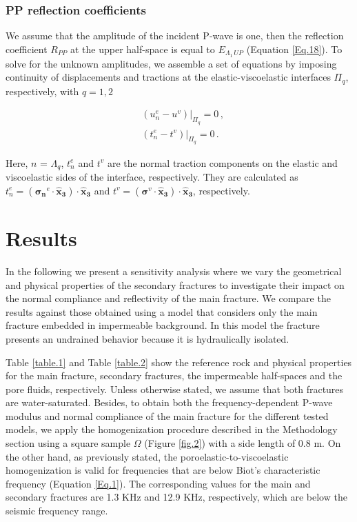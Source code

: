 \documentclass[draft]{agujournal2019}
\begin{document}
\subsubsection{PP reflection coefficients}
We assume that the amplitude of the incident P-wave is one, then the reflection coefficient $R_{PP}$ at the upper half-space is equal to $E_{\Lambda_1\, UP}$ (Equation \eqref{Eq.18}). To solve for the unknown amplitudes,  we assemble a set of equations by imposing continuity of displacements and tractions at the elastic-viscoelastic interfaces $\Pi_q$, respectively, with $q=1,2$
\begin{linenomath*}
\begin{equation}\label{Eq.22}
\begin{split}
&  \left. \left(  u_n^e -  u^v \right) \right \rvert_{\Pi_q} = 0 \,, \\
&  \left. \left( t_n^e  - t^v  \right) \right \rvert_{\Pi_q} = 0 \,.
\end{split}
\end{equation}
\end{linenomath*}
Here, $n$ = $\Lambda_q$, $t_n^e$ and $t^v$ are the normal traction components on the elastic and viscoelastic sides of the interface, respectively. They are calculated as $t_n^e =( \bm{\sigma_n}^e \cdot \bm{\hat {x}_3})\cdot \bm{\hat {x}_3} $ and  
$t^v =( \bm{\sigma}^v \cdot \bm{\hat {x}_3})\cdot \bm{\hat {x}_3} $, respectively.

\section{Results}

In the following we present a sensitivity analysis where we vary the geometrical and physical properties of the secondary fractures to investigate their impact on the normal compliance and reflectivity of the main fracture. 
We compare the  results against those obtained using a model that considers only the main fracture embedded in impermeable background. In this model the fracture presents an undrained behavior because it is hydraulically isolated.

Table \ref{table.1} and Table \ref{table.2} show the reference rock and physical properties for the main fracture, secondary fractures, the impermeable half-spaces and the pore fluids, respectively. Unless otherwise stated, we assume that both fractures are water-saturated. Besides, to obtain both the frequency-dependent P-wave modulus and normal compliance of the main fracture for the different tested models,  we apply the homogenization procedure described in the Methodology section using a square sample $\Omega$ (Figure \ref{fig.2}) with a side length of 0.8 m. On the other hand, as previously stated, the poroelastic-to-viscoelastic homogenization is valid for frequencies that are below Biot's characteristic frequency (Equation \eqref{Eq.1}). The corresponding values for the main and secondary fractures are 1.3 KHz and 12.9 KHz, respectively, which are below the seismic frequency range.
\end{document}
